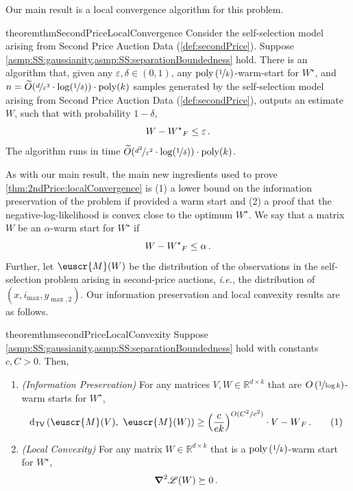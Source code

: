 \documentclass[11pt,letterpaper]{article}
\theoremstyle{plain}
\theoremstyle{definition}
\theoremstyle{remark}
\newcommand{\yesnum}{\addtocounter{equation}{1}\tag{\theequation}}
\newcommand{\inparen}[1]{\ensuremath{\left(#1\right)}}
\let\norm\relax
\newcommand{\norm}[1]{\ensuremath{\left\lVert #1 \right\rVert}}
\newcommand{\R}{\mathbb{R}}
\newcommand{\tv}[2]{\operatorname{d}_{\mathsf{TV}}{\inparen{#1,#2}}}
\newcommand{\nfrac}[2]{\nicefrac{#1}{#2}}
\newcommand{\poly}{\mathrm{poly}}
\newcommand{\eps}{\varepsilon}
\newcommand{\wt}[1]{\widetilde{#1}}
\newcommand{\customcal}[1]{\euscr{#1}}
\newcommand{\cL}{\customcal{L}}
\newcommand{\cM}{\customcal{M}}
\newcommand{\ie}{\emph{i.e.}}
\newcommand{\negLL}{\ensuremath{\mathscr{L}}}
\newcommand{\Wstar}{{W^\star}}
\renewcommand{\cL}{\negLL}
\newcommand{\smax}{\max,2} %
\newcommand{\ysmax}{y_{\smax}}
\begin{document}
{    \selfSelectionGauss*
    \selfSelectionSeparation*
    Our main result is a local convergence algorithm for this problem.
    \begin{restatable}[]{theorem}{thmSecondPriceLocalConvergence}\label{thm:2ndPrice:localConvergence}
        Consider the self-selection model arising from Second Price Auction Data (\cref{def:secondPrice}).
        Suppose \cref{asmp:SS:gaussianity,asmp:SS:separationBoundedness} hold.
        There is an algorithm that, given any $\eps,\delta\in (0,1)$, any $\poly\inparen{\nfrac{1}{k}}$-warm-start for $W^\star$, and \mbox{$n=\wt{O}(\nfrac{d}{\eps^2}\cdot {\log(\nicefrac1\delta)})\cdot \poly(k)$} samples generated by the self-selection model arising from Second Price Auction Data (\cref{def:secondPrice}), outputs an estimate $W$, such that with probability $1-\delta$, 
        \[
            \norm{W-W^\star}_F\leq \eps\,.
        \]
        The algorithm runs in time \mbox{$\wt{O}(\nfrac{d^2}{\eps^2}\cdot {\log(\nicefrac1\delta)} )\cdot \poly(k)$}.
    \end{restatable} 
    As with our main result, the main new ingredients used to prove \cref{thm:2ndPrice:localConvergence} is (1) a lower bound on the information preservation of the problem if provided a warm start and (2) a proof that the negative-log-likelihood is convex close to the optimum $W^\star$.
    We say that a matrix $W$ be an $\alpha$-warm start for $W^\star$ if
    \[
        \norm{W - W^\star}_F\leq \alpha\,.
    \]
    Further, let $\cM(W)$ be the distribution of the observations in the self-selection problem arising in second-price auctions, {\ie{}, the distribution of $(x,i_{\max}, \ysmax)$}.
    Our information preservation and local convexity results are as follows.
    \begin{restatable}{theorem}{thmsecondPriceLocalConvexity} 
        \label{thm:2ndPrice:localConvexity}
        Suppose \cref{asmp:SS:gaussianity,asmp:SS:separationBoundedness} hold with constants $c,C>0$.
        Then, %
        \begin{enumerate}[leftmargin=15pt]
            \item \textit{(Information Preservation)}
                For any matrices $V,W\in \R^{d\times k}$ that are $O\inparen{\nfrac{1}{\log{k}}}$-warm starts for $\Wstar$, 
                \[
                    \tv{\cM(V)}{~\cM(W)} \geq 
                    {\inparen{\frac{c}{ek}}^{{O({C^2/c^2}){}}}}
                    \cdot \norm{V - W}_F\,.
                    \yesnum\label{eq:2ndPrice:informationPreservation}
                \]
            \item \textit{(Local Convexity)} For any matrix $W\in \R^{d\times k}$ that is {a} $\poly\inparen{\nfrac{1}{k}}$-warm start for $\Wstar$, 
                \[
                    \grad^2 \cL(W) \succeq 0\,.
                \]
        \end{enumerate}
        

\end{restatable}}
\end{document}

